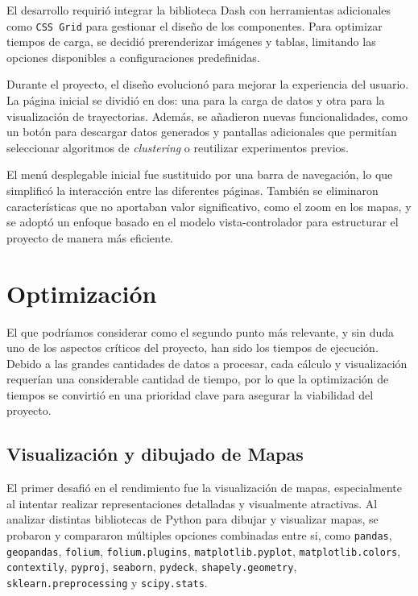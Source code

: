 El desarrollo requirió integrar la biblioteca Dash con herramientas adicionales como \texttt{CSS Grid} para gestionar el diseño de los componentes. Para optimizar tiempos de carga, se decidió prerenderizar imágenes y tablas, limitando las opciones disponibles a configuraciones predefinidas.

Durante el proyecto, el diseño evolucionó para mejorar la experiencia del usuario. La página inicial se dividió en dos: una para la carga de datos y otra para la visualización de trayectorias. Además, se añadieron nuevas funcionalidades, como un botón para descargar datos generados y pantallas adicionales que permitían seleccionar algoritmos de \textit{clustering} o reutilizar experimentos previos.

El menú desplegable inicial fue sustituido por una barra de navegación, lo que simplificó la interacción entre las diferentes páginas. También se eliminaron características que no aportaban valor significativo, como el zoom en los mapas, y se adoptó un enfoque basado en el modelo vista-controlador para estructurar el proyecto de manera más eficiente.

\section{Optimización}

El que podríamos considerar como el segundo punto más relevante, y sin duda uno de los aspectos críticos del proyecto, han sido los tiempos de ejecución. Debido a las grandes cantidades de datos a procesar, cada cálculo y visualización requerían una considerable cantidad de tiempo, por lo que la optimización de tiempos se convirtió en una prioridad clave para asegurar la viabilidad del proyecto.

\subsection{Visualización y dibujado de Mapas}

El primer desafió en el rendimiento fue la visualización de mapas, especialmente al intentar realizar representaciones detalladas y visualmente atractivas. Al analizar distintas bibliotecas de Python para dibujar y visualizar mapas, se probaron y compararon múltiples opciones combinadas entre si, como \texttt{pandas}, \texttt{geopandas}, \texttt{folium}, \texttt{folium.plugins}, \texttt{matplotlib.pyplot}, \texttt{matplotlib.colors}, \texttt{contextily}, \texttt{pyproj}, \texttt{seaborn}, \texttt{pydeck}, \texttt{shapely.geometry}, \texttt{sklearn.preprocessing} y \texttt{scipy.stats}.

